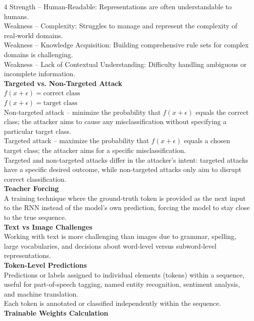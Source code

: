 \documentclass[8pt]{extarticle}
\begin{document}
\begin{multicols}{4}
Strength – Human‑Readable: Representations are often understandable to humans.\\
Weakness – Complexity: Struggles to manage and represent the complexity of real‑world domains.\\
Weakness – Knowledge Acquisition: Building comprehensive rule sets for complex domains is challenging.\\
Weakness – Lack of Contextual Understanding: Difficulty handling ambiguous or incomplete information.\\
\vspace{2pt}\textbf{Targeted vs. Non-Targeted Attack}\\
$f(x + \epsilon) = \text{correct class}$\\
$f(x + \epsilon) = \text{target class}$\\
Non-targeted attack – minimize the probability that $f(x + \epsilon)$ equals the correct class; the attacker aims to cause any misclassification without specifying a particular target class.\\
Targeted attack – maximize the probability that $f(x + \epsilon)$ equals a chosen target class; the attacker aims for a specific misclassification.\\
Targeted and non-targeted attacks differ in the attacker’s intent: targeted attacks have a specific desired outcome, while non-targeted attacks only aim to disrupt correct classification.\\
\vspace{2pt}\textbf{Teacher Forcing}\\
A training technique where the ground‑truth token is provided as the next input to the RNN instead of the model's own prediction, forcing the model to stay close to the true sequence.\\
\vspace{2pt}\textbf{Text vs Image Challenges}\\
Working with text is more challenging than images due to grammar, spelling, large vocabularies, and decisions about word‑level versus subword‑level representations.\\
\vspace{2pt}\textbf{Token-Level Predictions}\\
Predictions or labels assigned to individual elements (tokens) within a sequence, useful for part-of-speech tagging, named entity recognition, sentiment analysis, and machine translation.\\
Each token is annotated or classified independently within the sequence.\\
\vspace{2pt}\textbf{Trainable Weights Calculation}\\


\end{multicols}
\end{document}
